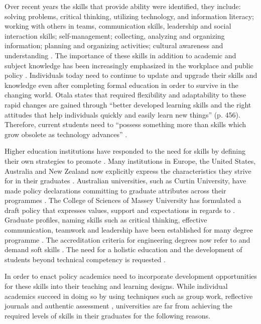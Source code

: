 Over recent years the skills that provide \LLLs ability were identified, they
include: solving problems, critical thinking, utilizing technology, and
information literacy; working with others in teams, communication skills,
leadership and social interaction skills; self-management; collecting, analyzing
and organizing information; planning and organizing activities; cultural
awareness and understanding
\citep{Brooks2008,Heinrich2007,Otala1997,Pitman2009}. The importance of these
skills in addition to academic and subject knowledge has been increasingly
emphasized in the workplace and public policy
\citep{Morgan-Klein2007,Sutherland2006}. Individuals today need to continue to
update and upgrade their skills and knowledge even after completing formal
education in order to survive in the changing world. Otala
\citeyearpar{Otala1997} states that required flexibility and adaptability to
these rapid changes are gained through ``better developed learning skills and
the right attitudes that help individuals quickly and easily learn new things''
(p. 456). Therefore, current students need to ``possess something more than
skills which grow obsolete as technology advances'' \cite[p.~195]{Field2003}. 

Higher education institutions have responded to the need for \LLLs skills by
defining their own strategies to promote \LLLsn. Many institutions in Europe,
the United States, Australia and New Zealand now explicitly express the \LLLs
characteristics they strive for in their graduates \citep{Scanlon2006}.
Australian universities, such as Curtin University, have made policy
declarations committing to graduate attributes across their programmes
\citep{CurtinUniversity2006}. The College of Sciences of Massey University has
formulated a draft \LLLs policy \citep{MasseyUniversity2008} that expresses
values, support and expectations in regards to \LLLsn. Graduate profiles, naming
\LLLs skills such as critical thinking, effective communication, teamwork and
leadership have been established for many degree programme
\citep{Davies2003,McAlister2003}. The accreditation criteria for engineering
degrees now refer to and demand soft skills \citep{Aller2005,Muffo2001}. The
need for a holistic education and the development of students beyond technical
competency is requested \citep{Brakke2002,Davies2003,Dowling2006,Fallows2003,Grabowski2004,Hernon2006}.

In order to enact policy academics need to incorporate development opportunities
for these skills into their teaching and learning designs. While individual
academics succeed in doing so by using techniques such as group work, reflective
journals and authentic assessment \citep{Clarke2003,Lombardi2008}, universities
are far from achieving the required levels of \LLLs skills in their graduates
for the following reasons.

